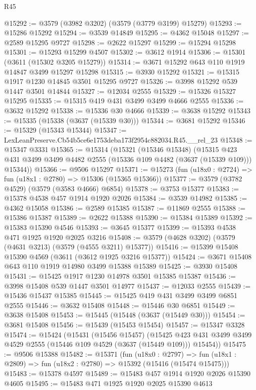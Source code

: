 \begin{lexlean}{R45}
\begin{coremodule}
@15292 := @3579 (@3982 @3202) (@3579 (@3779 @3199) @15279)
@15293 := @15286 @15292
@15294 := @3539 @14849
@15295 := @4362 @15048
@15297 := @2589 @15295 @9727
@15298 := @2622 @15297
@15299 := @15294 @15298
@15301 := @15293 @15299 @4507
@15302 := @3612 @1914
@15306 := @15301 (@3611 (@15302 @3205 @15279))
@15314 := @3671 @15292 @643 @110 @1919 @14847 @3499 @15297 @15298
@15315 := @3930 @15292
@15321 := @15315 @1917 @1230 @14845 @3501 @15295 @9727
@15326 := @3998 @15292 @539 @1447 @3501 @14844
@15327 := @12034 @2555
@15329 := @15326 @15327 @15295
@15335 := @15315 @419 @431 @3499 @3499 @4666 @2555
@15336 := @3632 @15292
@15338 := @15336 @30 @4666
@15339 := @3638 @15292
@15343 := @15335 (@15338 (@3637 (@15339 @30)))
@15344 := @3681 @15292
@15346 := @15329 (@15343 @15344)
@15347 := LexLeanPreserve.Cb54b5ce6e1753deba173f2954c882034.R45.__rel_23
@15348 := @15347 @3331
@15365 := @15314
    (@15321
      (@15346 @15348)
      (@15315 @423 @431 @3499 @3499 @4482 @2555 (@15336 @109 @4482 (@3637 (@15339 @109))) @15344))
@15366 := @9506 @15297
@15371 := @15273 (fun (u18x0 : @2724) => fun (u18x1 : @2780) => @15306 (@15365 @15366))
@15377 := @3579 (@3782 @4529) (@3579 (@3583 @4666) @6854)
@15378 := @3753 @15377
@15383 := @15378 @4538 @457 @1914 @1920 @2026
@15384 := @3539 @14982
@15385 := @4362 @15058
@15386 := @2589 @15385
@15387 := @11869 @2555
@15388 := @15386 @15387
@15389 := @2622 @15388
@15390 := @15384 @15389
@15392 := @15383 @15390 @4546
@15393 := @3645 @15377
@15399 := @15393 @4538 @471 @1925 @1920 @2025 @3216
@15408 := @3579 (@4628 @3202) (@3579 (@4631 @3213) (@3579 (@4555 @3211) @15377))
@15416 := @15399 @15408 @15390 @4569 (@3611 (@3612 @1925 @3216 @15377))
@15424 := @3671 @15408 @643 @110 @1919 @14980 @3499 @15388 @15389
@15425 := @3930 @15408
@15431 := @15425 @1917 @1230 @14978 @3501 @15385 @15387
@15436 := @3998 @15408 @539 @1447 @3501 @14977
@15437 := @12033 @2555
@15439 := @15436 @15437 @15385
@15445 := @15425 @419 @431 @3499 @3499 @6851 @2555
@15446 := @3632 @15408
@15448 := @15446 @30 @6851
@15449 := @3638 @15408
@15453 := @15445 (@15448 (@3637 (@15449 @30)))
@15454 := @3681 @15408
@15456 := @15439 (@15453 @15454)
@15457 := @15347 @3328
@15474 := @15424
    (@15431
      (@15456 @15457)
      (@15425 @423 @431 @3499 @3499 @4529 @2555 (@15446 @109 @4529 (@3637 (@15449 @109))) @15454))
@15475 := @9506 @15388
@15482 := @15371
    (fun (u18x0 : @2797) =>
    fun (u18x1 : @2809) => fun (u18x2 : @2780) => @15392 (@15416 (@15474 @15475)))
@15483 := @15378 @4597
@15489 := @15483 @457 @1914 @1920 @2026 @15390 @4605
@15495 := @15483 @471 @1925 @1920 @2025 @15390 @4613

\end{coremodule}
\end{lexlean}
